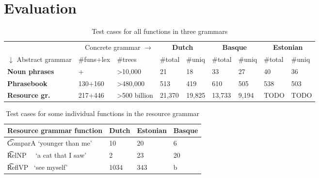 \section{Evaluation}

\begin{table}[h]
\centering
\begin{tabular}{|lll|ll|ll|ll|}
\hline
\multicolumn{3}{|r}{Concrete grammar $\rightarrow$}              &
                                                                   \multicolumn{2}{|c}{\bf Dutch} & \multicolumn{2}{|c}{\bf Basque} & \multicolumn{2}{|c|}{\bf Estonian} \\
$\downarrow$ Abstract grammar & \#funs+lex & \#trees  &
                                                                 \#total & \#uniq & \#total & \#uniq  & \#total  & \#uniq \\ \hline
{\bf Noun phrases}     & \numOfFun{}+\numOfLex{}        & \textgreater{}10,000          & 21    & 18     & 33      & 27      & 40       & 36     \\ \hline
{\bf Phrasebook}       
                  & 130+160   & \textgreater{}480,000       
   & 513     & 419    & 610     & 505     & 538      & 503   \\ \hline
   {\bf Resource gr.}    & 217+446   & \textgreater{}500 billion  
   & 21,370  & 19,825 &  13,733  & 9,194    & TODO  & TODO \\ \hline
\end{tabular}
\caption{Test cases for all functions in three grammars}
\label{results}
\end{table}


\begin{table}[h]

\centering
\begin{tabular}{|l|l|l|l|}
\hline
{\bf Resource grammar function} & {\bf Dutch}
   & {\bf Estonian} & {\bf Basque} \\ \hline
 
\t{ComparA} `younger than me'  & 10   & 20 & 6   \\
\t{RelNP~~} `a cat that I saw' & 2    & 23 & 20   \\
\t{ReflVP~} `see myself'       & 1034 & 343 & b   \\
\hline
\end{tabular}
\caption{Test cases for some individual functions in the resource grammar}
\label{results_indiv}
\end{table}

